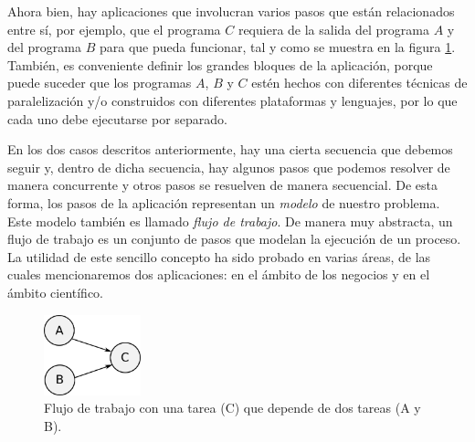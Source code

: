 Ahora bien, hay aplicaciones que involucran varios pasos que están relacionados entre sí, por ejemplo, que el programa $C$ requiera de la salida del programa $A$ y del programa $B$ para que pueda funcionar, tal y como se muestra en la figura \ref{fig:workflowABC}. También, es conveniente definir los grandes bloques de la aplicación, porque puede suceder que los programas $A$, $B$ y $C$ estén hechos con diferentes técnicas de paralelización y/o construidos con diferentes plataformas y lenguajes, por lo que cada uno debe ejecutarse por separado. 

En los dos casos descritos anteriormente, hay una cierta secuencia que debemos seguir y, dentro de dicha secuencia, hay algunos pasos que podemos resolver de manera concurrente y otros pasos se resuelven de manera secuencial. De esta forma, los pasos de la aplicación representan un \emph{modelo} de nuestro problema. Este modelo también es llamado \emph{flujo de trabajo}. De manera muy abstracta, un flujo de trabajo es un conjunto de pasos que modelan la ejecución de un proceso. La utilidad de este sencillo concepto ha sido probado en varias áreas, de las cuales mencionaremos dos aplicaciones: en el ámbito de los negocios y en el ámbito científico.

\begin{figure}
    \begin{center}
        \includegraphics[width=0.25\textwidth]{imagenes/workflowABC}
    \end{center}
    \caption{Flujo de trabajo con una tarea (C) que depende de dos tareas (A y B).}
    \label{fig:workflowABC}
\end{figure} 

